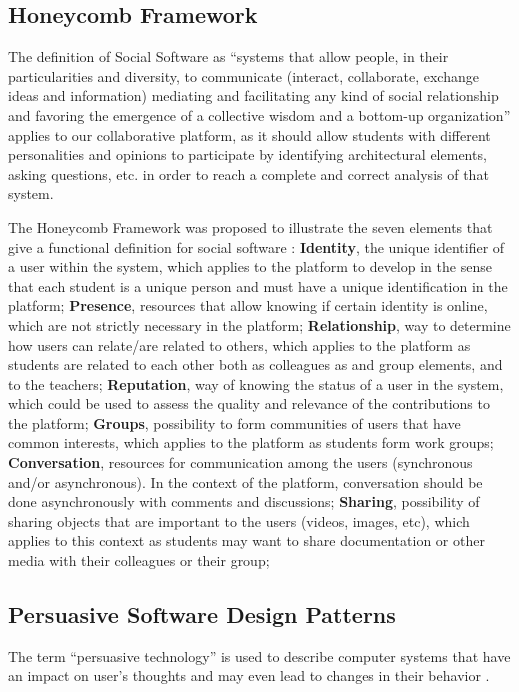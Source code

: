 \documentclass{llncs}
\begin{document}
\subsection{Honeycomb Framework}
\label{relatedWorkHoneycomb}
The definition of Social Software as ``systems that allow people, in their particularities and diversity, to communicate (interact, collaborate, exchange ideas and information) mediating and facilitating any kind of social relationship and favoring the emergence of a collective wisdom and a bottom-up organization'' \cite{pereira2010social} applies to our collaborative platform, as it should allow students with different personalities and opinions to participate by identifying architectural elements, asking questions, etc. in order to reach a complete and correct analysis of that system. 

The Honeycomb Framework was proposed to illustrate the seven elements that give a functional definition for social software \cite{smith2007social}: \textbf{Identity}, the unique identifier of a user within the system, which applies to the platform to develop in the sense that each student is a unique person and must have a unique identification in the platform; \textbf{Presence}, resources that allow knowing if certain identity is online, which are not strictly necessary in the platform; \textbf{Relationship}, way to determine how users can relate/are related to others, which applies to the platform as students are related to each other both as colleagues as and group elements, and to the teachers; \textbf{Reputation}, way of knowing the status of a user in the system, which could be used to assess the quality and relevance of the contributions to the platform; \textbf{Groups}, possibility to form communities of users that have common interests, which applies to the platform as students form work groups; \textbf{Conversation}, resources for communication among the users (synchronous and/or asynchronous). In the context of the platform, conversation should be done asynchronously with comments and discussions; \textbf{Sharing}, possibility of sharing objects that are important to the users (videos, images, etc), which applies to this context as students may want to share documentation or other media with their colleagues or their group;

\subsection{Persuasive Software Design Patterns}
\label{relatedWorkPersuasive}
The term ``persuasive technology'' is used to describe computer systems that have an impact on user's thoughts and may even lead to changes in their behavior \cite{fogg2002persuasive,oinas2009persuasive}.
\end{document}
